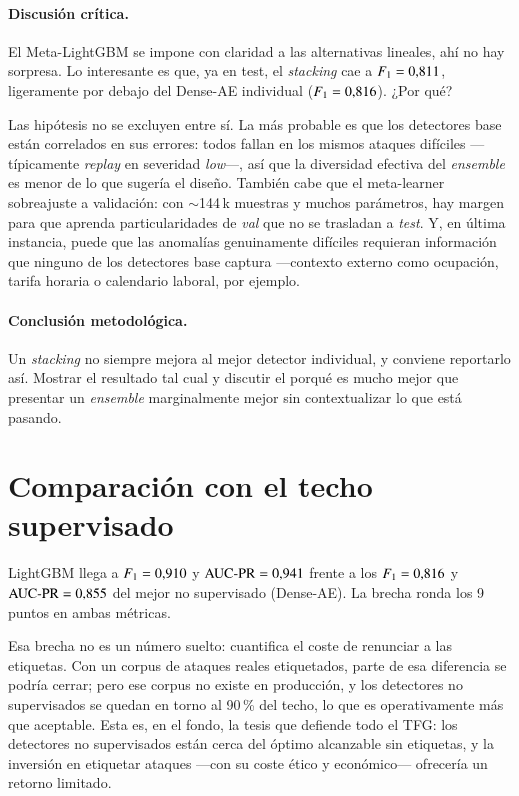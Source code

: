 \paragraph{Discusión crítica.} El Meta-LightGBM se impone con claridad a las alternativas lineales, ahí no hay sorpresa. Lo interesante es que, ya en test, el \textit{stacking} cae a $F_{1}=0{,}811$, ligeramente por debajo del Dense-AE individual ($F_{1}=0{,}816$). ¿Por qué?

Las hipótesis no se excluyen entre sí. La más probable es que los detectores base están correlados en sus errores: todos fallan en los mismos ataques difíciles ---típicamente \textit{replay} en severidad \textit{low}---, así que la diversidad efectiva del \textit{ensemble} es menor de lo que sugería el diseño. También cabe que el meta-learner sobreajuste a validación: con $\sim$144\,k muestras y muchos parámetros, hay margen para que aprenda particularidades de \textit{val} que no se trasladan a \textit{test}. Y, en última instancia, puede que las anomalías genuinamente difíciles requieran información que ninguno de los detectores base captura ---contexto externo como ocupación, tarifa horaria o calendario laboral, por ejemplo.

\paragraph{Conclusión metodológica.} Un \textit{stacking} no siempre mejora al mejor detector individual, y conviene reportarlo así. Mostrar el resultado tal cual y discutir el porqué es mucho mejor que presentar un \textit{ensemble} marginalmente mejor sin contextualizar lo que está pasando.

\section{Comparación con el techo supervisado}
\label{sec:resultados-techo}

LightGBM llega a $F_{1}=0{,}910$ y $\text{AUC-PR}=0{,}941$ frente a los $F_{1}=0{,}816$ y $\text{AUC-PR}=0{,}855$ del mejor no supervisado (Dense-AE). La brecha ronda los 9 puntos en ambas métricas.

Esa brecha no es un número suelto: cuantifica el coste de renunciar a las etiquetas. Con un corpus de ataques reales etiquetados, parte de esa diferencia se podría cerrar; pero ese corpus no existe en producción, y los detectores no supervisados se quedan en torno al 90\,\% del techo, lo que es operativamente más que aceptable. Esta es, en el fondo, la tesis que defiende todo el TFG: los detectores no supervisados están cerca del óptimo alcanzable sin etiquetas, y la inversión en etiquetar ataques ---con su coste ético y económico--- ofrecería un retorno limitado.

